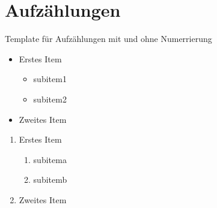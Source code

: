 \section{Aufzählungen}
\label{sec:aufzaehlungen} %
Template für Aufzählungen mit und ohne Numerrierung
\begin{itemize} %
\item Erstes Item
	\begin{itemize}
	\item subitem1
	\item subitem2
	\end{itemize}	
\item Zweites Item 
\end{itemize}

\begin{enumerate} %
	\item Erstes Item
	\begin{enumerate}
		\item subitema
		\item subitemb
	\end{enumerate}	
	\item Zweites Item 
\end{enumerate}